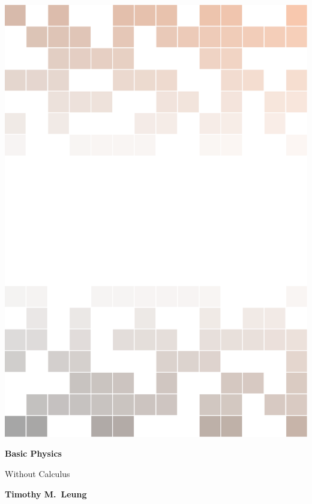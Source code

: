 \documentclass[
  12pt, %
  letterpaper,
]{LegrandOrangeBook}
\begin{document}

\titlepage %
    {\includegraphics[width=\paperwidth]{background.pdf}} %
    { %
      \centering\sffamily %
	  {\Huge\bfseries Basic Physics\par} %
	  \vspace{16pt} %
		 {\LARGE Without Calculus\par} %
		 \vspace{24pt} %
		        {\huge\bfseries Timothy M.\ Leung\par} %
    }
    
\end{document}
